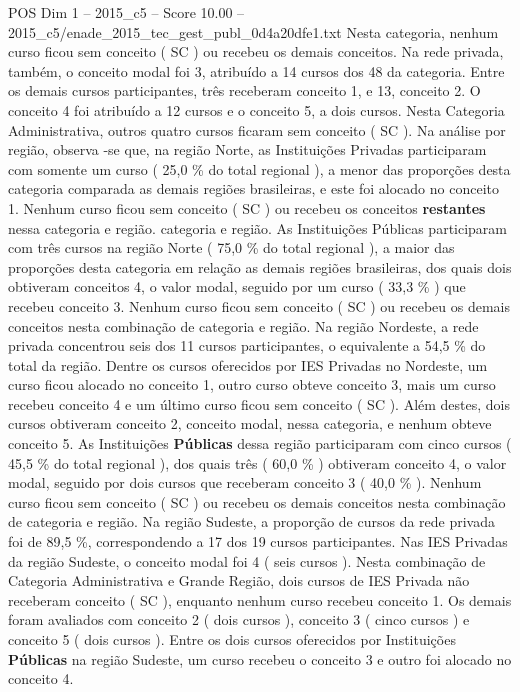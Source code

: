 \begin{textsample}{POS Dim 1 – 2015\_c5 – Score 10.00 – 2015\_c5/enade\_2015\_tec\_gest\_publ\_0d4a20dfe1.txt}
Nesta categoria, nenhum curso ficou sem conceito ( SC ) ou recebeu os demais conceitos.
Na rede privada, também, o conceito modal foi 3, atribuído a 14 cursos dos 48 da categoria.
Entre os demais cursos participantes, três receberam conceito 1, e 13, conceito 2.
O conceito 4 foi atribuído a 12 cursos e o conceito 5, a dois cursos.
Nesta Categoria Administrativa, outros quatro cursos ficaram sem conceito ( SC ).
Na análise por região, observa -se que, na região Norte, as Instituições Privadas participaram com somente um curso ( 25,0 \% do total regional ), a menor das proporções desta categoria comparada as demais regiões brasileiras, e este foi alocado no conceito 1.
Nenhum curso ficou sem conceito ( SC ) ou recebeu os conceitos \textbf{restantes} nessa categoria e região. categoria e região.
As Instituições Públicas participaram com três cursos na região Norte ( 75,0 \% do total regional ), a maior das proporções desta categoria em relação as demais regiões brasileiras, dos quais dois obtiveram conceitos 4, o valor modal, seguido por um curso ( 33,3 \% ) que recebeu conceito 3.
Nenhum curso ficou sem conceito ( SC ) ou recebeu os demais conceitos nesta combinação de categoria e região.
Na região Nordeste, a rede privada concentrou seis dos 11 cursos participantes, o equivalente a 54,5 \% do total da região.
Dentre os cursos oferecidos por IES Privadas no Nordeste, um curso ficou alocado no conceito 1, outro curso obteve conceito 3, mais um curso recebeu conceito 4 e um último curso ficou sem conceito ( SC ).
Além destes, dois cursos obtiveram conceito 2, conceito modal, nessa categoria, e nenhum obteve conceito 5.
As Instituições \textbf{Públicas} dessa região participaram com cinco cursos ( 45,5 \% do total regional ), dos quais três ( 60,0 \% ) obtiveram conceito 4, o valor modal, seguido por dois cursos que receberam conceito 3 ( 40,0 \% ).
Nenhum curso ficou sem conceito ( SC ) ou recebeu os demais conceitos nesta combinação de categoria e região.
Na região Sudeste, a proporção de cursos da rede privada foi de 89,5 \%, correspondendo a 17 dos 19 cursos participantes.
Nas IES Privadas da região Sudeste, o conceito modal foi 4 ( seis cursos ).
Nesta combinação de Categoria Administrativa e Grande Região, dois cursos de IES Privada não receberam conceito ( SC ), enquanto nenhum curso recebeu conceito 1.
Os demais foram avaliados com conceito 2 ( dois cursos ), conceito 3 ( cinco cursos ) e conceito 5 ( dois cursos ).
Entre os dois cursos oferecidos por Instituições \textbf{Públicas} na região Sudeste, um curso recebeu o conceito 3 e outro foi alocado no conceito 4.

\end{textsample}
